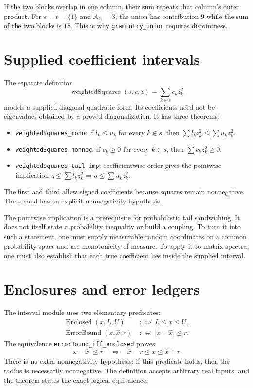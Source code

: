 \documentclass[11pt]{article}
\newcommand{\decl}[1]{\nolinkurl{#1}}
\begin{document}
If the two blocks overlap in one column, their sum repeats that column's
outer product. For $s=t=\{1\}$ and $A_{i1}=3$, the union has contribution $9$
while the sum of the two blocks is $18$. This is why
\decl{gramEntry_union} requires disjointness.

\section{Supplied coefficient intervals}

The separate definition
\[
 \operatorname{weightedSquares}(s,c,z)=\sum_{k\in s}c_k z_k^2
\]
models a supplied diagonal quadratic form. Its coefficients need not be
eigenvalues obtained by a proved diagonalization. It has three theorems:
\begin{itemize}
 \item \decl{weightedSquares_mono}: if $l_k\le u_k$ for every $k\in s$, then
 $\sum l_kz_k^2\le\sum u_kz_k^2$.
 \item \decl{weightedSquares_nonneg}: if $c_k\ge0$ for every $k\in s$, then
 $\sum c_kz_k^2\ge0$.
 \item \decl{weightedSquares_tail_imp}: coefficientwise order gives the
 pointwise implication $q\le\sum l_kz_k^2\Rightarrow q\le\sum u_kz_k^2$.
\end{itemize}
The first and third allow signed coefficients because squares remain
nonnegative. The second has an explicit nonnegativity hypothesis.

The pointwise implication is a prerequisite for probabilistic tail
sandwiching. It does not itself state a probability inequality or build a
coupling. To turn it into such a statement, one must supply measurable random
coordinates on a common probability space and use monotonicity of measure.
To apply it to matrix spectra, one must also establish that each true
coefficient lies inside the supplied interval.

\section{Enclosures and error ledgers}

The interval module uses two elementary predicates:
\begin{align*}
 \operatorname{Enclosed}(x,L,U)&\;:\Longleftrightarrow\;L\le x\le U,\\
 \operatorname{ErrorBound}(x,\widehat x,r)&\;:\Longleftrightarrow\;
 |x-\widehat x|\le r.
\end{align*}
The equivalence \decl{errorBound_iff_enclosed} proves
\[
 |x-\widehat x|\le r
 \quad\Longleftrightarrow\quad
 \widehat x-r\le x\le\widehat x+r.
\]
There is no extra nonnegativity hypothesis: if this predicate holds, then the
radius is necessarily nonnegative. The definition accepts arbitrary real
inputs, and the theorem states the exact logical equivalence.
\end{document}
